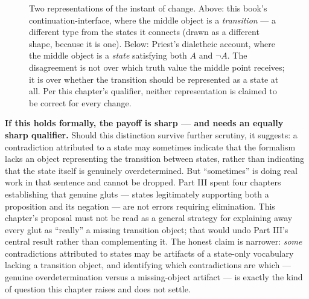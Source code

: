 \begin{figure}[htbp]
\centering
{}
\caption{Two representations of the instant of change. Above: this
book's continuation-interface, where the middle object is a
\emph{transition} --- a different type from the states it connects
(drawn as a different shape, because it is one). Below: Priest's
dialetheic account, where the middle object is a \emph{state} satisfying
both $A$ and $\neg A$. The disagreement is not over which truth value
the middle point receives; it is over whether the transition should be
represented as a state at all. Per this chapter's qualifier, neither
representation is claimed to be correct for every change.}
\label{fig:state-vs-transition}
\end{figure}

\textbf{If this holds formally, the payoff is sharp --- and needs an equally
sharp qualifier.} Should this distinction survive further scrutiny, it
suggests: a contradiction attributed to a state may sometimes indicate
that the formalism lacks an object representing the transition between
states, rather than indicating that the state itself is genuinely
overdetermined. But ``sometimes'' is doing real work in that sentence and
cannot be dropped. Part III spent four chapters establishing that
genuine gluts --- states legitimately supporting both a proposition and its
negation --- are not errors requiring elimination. This chapter's proposal
must not be read as a general strategy for explaining away every glut as
``really'' a missing transition object; that would undo Part III's central
result rather than complementing it. The honest claim is narrower: \emph{some}
contradictions attributed to states may be artifacts of a state-only
vocabulary lacking a transition object, and identifying which
contradictions are which --- genuine overdetermination versus a
missing-object artifact --- is exactly the kind of question this chapter
raises and does not settle.

